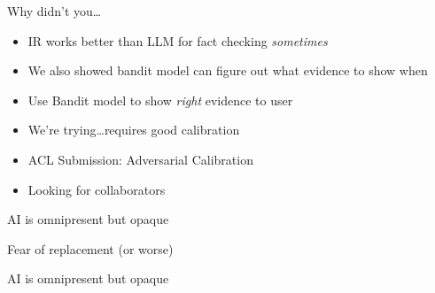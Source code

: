 \documentclass[compress]{beamer}
\newcommand{\fsi}[2]{
\begin{frame}[plain]
\vspace*{-1pt}
\makebox[\linewidth]{\texttt{[image: \#1]}}
\begin{center}
#2
\end{center}
\end{frame}
}
\newif\iflong\longfalse
\begin{document}
\begin{frame}{Why didn't you\dots}
  \begin{itemize}
  \item IR works better than LLM for fact checking \emph{sometimes}
  \item We also showed bandit model can figure out what evidence to show when
  \item Use Bandit model to show \emph{right} evidence to user
    \pause
  \item We're trying\dots requires good calibration
  \item ACL Submission: Adversarial Calibration
  \item Looking for collaborators
  \end{itemize}
\end{frame}


\fsi{general_figures/black_box_outline}{AI is omnipresent but opaque}
\fsi{general_figures/kill_all_humans}{Fear of replacement (or worse)}
\fsi{general_figures/blackbox}{AI is omnipresent but opaque}
\fsi{general_figures/tng_poker}{}

\fsi{advcal/qanta_2025}{}

\iflong
\end{document}
